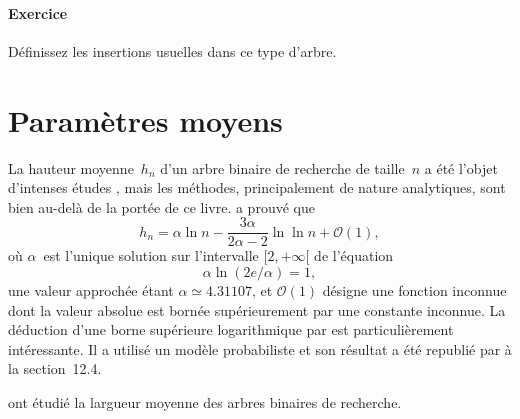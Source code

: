 \paragraph{Exercice}

Définissez les insertions usuelles dans ce type d'arbre.


\section{Paramètres moyens}

La hauteur moyenne~\(h_n\) d'un arbre binaire de recherche de
taille~\(n\) a été l'objet d'intenses études \citep{Devroye_1986,
  Devroye_1987, Mahmoud_1992, KnesslSpankowski_2002}, mais les
méthodes, principalement de nature analytiques, sont bien au-delà de
la portée de ce livre. \cite{Reed_2003} a prouvé que
\begin{equation*}
h_n = \alpha \ln n - \frac{3\alpha}{2\alpha - 2} \ln\ln n + \mathcal{O}(1),
\end{equation*}
où \(\alpha\)~est l'unique solution sur l'intervalle \([2,+\infty[\)
de l'équation
\begin{equation*}
\alpha\ln(2e/\alpha) = 1,
\end{equation*}
une valeur approchée étant \(\alpha \simeq 4.31107\), et
\(\mathcal{O}(1)\) désigne une fonction inconnue dont la valeur
absolue est bornée supérieurement par une constante inconnue. La
déduction d'une borne supérieure logarithmique par \cite{Aslam_2001}
est particulièrement intéressante. Il a utilisé un modèle probabiliste
et son résultat a été republié par \cite{CLRS_2009} à la section~12.4.

\cite{ChauvinDrmotaJabbour-Hattab_2001} ont étudié la largueur moyenne
des arbres binaires de recherche.

